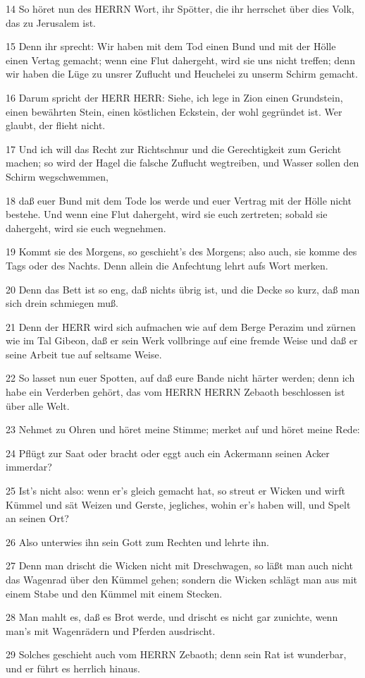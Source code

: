 \par 14 So höret nun des HERRN Wort, ihr Spötter, die ihr herrschet über dies Volk, das zu Jerusalem ist.
\par 15 Denn ihr sprecht: Wir haben mit dem Tod einen Bund und mit der Hölle einen Vertag gemacht; wenn eine Flut dahergeht, wird sie uns nicht treffen; denn wir haben die Lüge zu unsrer Zuflucht und Heuchelei zu unserm Schirm gemacht.
\par 16 Darum spricht der HERR HERR: Siehe, ich lege in Zion einen Grundstein, einen bewährten Stein, einen köstlichen Eckstein, der wohl gegründet ist. Wer glaubt, der flieht nicht.
\par 17 Und ich will das Recht zur Richtschnur und die Gerechtigkeit zum Gericht machen; so wird der Hagel die falsche Zuflucht wegtreiben, und Wasser sollen den Schirm wegschwemmen,
\par 18 daß euer Bund mit dem Tode los werde und euer Vertrag mit der Hölle nicht bestehe. Und wenn eine Flut dahergeht, wird sie euch zertreten; sobald sie dahergeht, wird sie euch wegnehmen.
\par 19 Kommt sie des Morgens, so geschieht's des Morgens; also auch, sie komme des Tags oder des Nachts. Denn allein die Anfechtung lehrt aufs Wort merken.
\par 20 Denn das Bett ist so eng, daß nichts übrig ist, und die Decke so kurz, daß man sich drein schmiegen muß.
\par 21 Denn der HERR wird sich aufmachen wie auf dem Berge Perazim und zürnen wie im Tal Gibeon, daß er sein Werk vollbringe auf eine fremde Weise und daß er seine Arbeit tue auf seltsame Weise.
\par 22 So lasset nun euer Spotten, auf daß eure Bande nicht härter werden; denn ich habe ein Verderben gehört, das vom HERRN HERRN Zebaoth beschlossen ist über alle Welt.
\par 23 Nehmet zu Ohren und höret meine Stimme; merket auf und höret meine Rede:
\par 24 Pflügt zur Saat oder bracht oder eggt auch ein Ackermann seinen Acker immerdar?
\par 25 Ist's nicht also: wenn er's gleich gemacht hat, so streut er Wicken und wirft Kümmel und sät Weizen und Gerste, jegliches, wohin er's haben will, und Spelt an seinen Ort?
\par 26 Also unterwies ihn sein Gott zum Rechten und lehrte ihn.
\par 27 Denn man drischt die Wicken nicht mit Dreschwagen, so läßt man auch nicht das Wagenrad über den Kümmel gehen; sondern die Wicken schlägt man aus mit einem Stabe und den Kümmel mit einem Stecken.
\par 28 Man mahlt es, daß es Brot werde, und drischt es nicht gar zunichte, wenn man's mit Wagenrädern und Pferden ausdrischt.
\par 29 Solches geschieht auch vom HERRN Zebaoth; denn sein Rat ist wunderbar, und er führt es herrlich hinaus.

